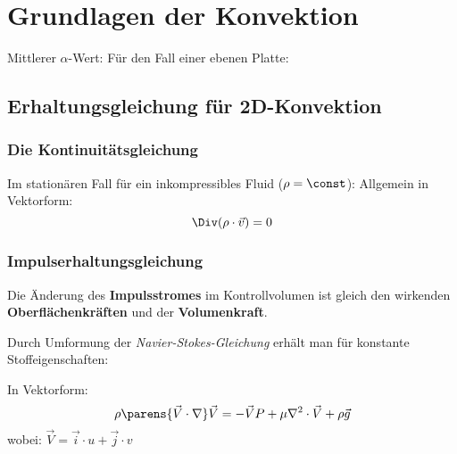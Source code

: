 
\section{Grundlagen der Konvektion} %
		Mittlerer $\alpha$-Wert:
		Für den Fall einer ebenen Platte:

	\subsection{Erhaltungsgleichung für 2D-Konvektion} %
		\subsubsection{Die Kontinuitätsgleichung} %
			Im stationären Fall für ein inkompressibles Fluid ($\rho = \const$):
			Allgemein in Vektorform:
			\[
				\Div(\rho \cdot \vec v) = 0
			\]
		\subsubsection{Impulserhaltungsgleichung} %
			 Die Änderung des \textbf{Impulsstromes} im Kontrollvolumen ist gleich den wirkenden \textbf{Oberflächenkräften} und der \textbf{Volumenkraft}.

			Durch Umformung der \emph{Navier-Stokes-Gleichung} erhält man für konstante Stoffeigenschaften:

			In Vektorform:
			\[
				\rho \parens{\vec V \cdot \nabla} \vec V = - \vec V P + \mu \nabla^2 \cdot \vec V + \rho \vec g
			\]
			wobei:
			$
				\vec V = \vec i \cdot u + \vec j \cdot v
			$
